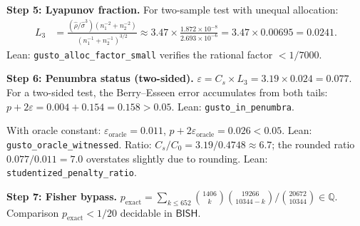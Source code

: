 \documentclass[11pt,a4paper]{article}
\theoremstyle{plain}
\theoremstyle{definition}
\newcommand{\BISH}{\textsf{BISH}}
\newcommand{\Q}{\mathbb{Q}}
\begin{document}
\smallskip\noindent\textbf{Step 5: Lyapunov fraction.}  For two-sample test with unequal allocation:
\begin{align*}
  L_3 &= \frac{(\hat\rho/\hat\sigma^3)(n_1^{-2} + n_2^{-2})}{(n_1^{-1} + n_2^{-1})^{3/2}} \approx 3.47 \times \frac{1.872 \times 10^{-8}}{2.693 \times 10^{-6}} = 3.47 \times 0.00695 = 0.0241.
\end{align*}
Lean: \texttt{gusto\_alloc\_factor\_small} verifies the rational factor $< 1/7000$.

\smallskip\noindent\textbf{Step 6: Penumbra status (two-sided).}  $\varepsilon = C_s \times L_3 = 3.19 \times 0.024 = 0.077$.  For a two-sided test, the Berry--Esseen error accumulates from both tails: $p + 2\varepsilon = 0.004 + 0.154 = 0.158 > 0.05$.  Lean: \texttt{gusto\_in\_penumbra}.

With oracle constant: $\varepsilon_{\mathrm{oracle}} = 0.011$, $p + 2\varepsilon_{\mathrm{oracle}} = 0.026 < 0.05$.  Lean: \texttt{gusto\_oracle\_witnessed}.  Ratio: $C_s/C_0 = 3.19/0.4748 \approx 6.7$; the rounded ratio $0.077/0.011 = 7.0$ overstates slightly due to rounding.  Lean: \texttt{studentized\_penalty\_ratio}.

\smallskip\noindent\textbf{Step 7: Fisher bypass.}  $p_{\mathrm{exact}} = \sum_{k \leq 652} \binom{1406}{k}\binom{19266}{10344-k}/\binom{20672}{10344} \in \Q$.  Comparison $p_{\mathrm{exact}} < 1/20$ decidable in $\BISH$.
\end{document}
